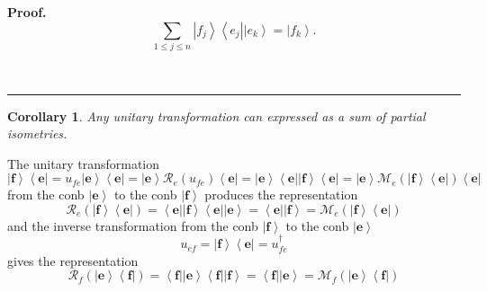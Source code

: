 \documentclass[aps,preprint]{revtex4}%
\newtheorem{corollary}[theorem]{Corollary}
\newenvironment{proof}[1][Proof]{\noindent\textbf{#1.} }{\ \rule{0.5em}{0.5em}}
\begin{document}
\begin{proof}%
\begin{equation}
\sum_{1\leq j\leq n}\left\vert f_{j}\right\rangle \left\langle e_{j}%
\right\vert \left\vert e_{k}\right\rangle =\left\vert f_{k}\right\rangle .
\end{equation}

\end{proof}

\begin{corollary}
\emph{Any unitary transformation can expressed as a sum of partial
isometries.}
\end{corollary}

The unitary transformation
\[
\left\vert \mathbf{f}\right\rangle \left\langle \mathbf{e}\right\vert
=u_{fe}\left\vert \mathbf{e}\right\rangle \left\langle \mathbf{e}\right\vert
=\left\vert \mathbf{e}\right\rangle \mathcal{R}_{e}\left(  u_{fe}\right)
\left\langle \mathbf{e}\right\vert =\left\vert \mathbf{e}\right\rangle
\left\langle \mathbf{e}\right\vert \left\vert \mathbf{f}\right\rangle
\left\langle \mathbf{e}\right\vert =\left\vert \mathbf{e}\right\rangle
\mathcal{M}_{e}\left(  \left\vert \mathbf{f}\right\rangle \left\langle
\mathbf{e}\right\vert \right)  \left\langle \mathbf{e}\right\vert
\]
from the conb $\left\vert \mathbf{e}\right\rangle $ to the conb $\left\vert
\mathbf{f}\right\rangle $ produces the representation
\begin{equation}
\mathcal{R}_{e}\left(  \left\vert \mathbf{f}\right\rangle \left\langle
\mathbf{e}\right\vert \right)  =\left\langle \mathbf{e}\right\vert \left\vert
\mathbf{f}\right\rangle \left\langle \mathbf{e}\right\vert \left\vert
\mathbf{e}\right\rangle =\left\langle \mathbf{e}\right\vert \left\vert
\mathbf{f}\right\rangle =\mathcal{M}_{e}\left(  \left\vert \mathbf{f}%
\right\rangle \left\langle \mathbf{e}\right\vert \right)
\end{equation}
and the inverse transformation from the conb $\left\vert \mathbf{f}%
\right\rangle $ to the conb $\left\vert \mathbf{e}\right\rangle $
\begin{equation}
u_{ef}=\left\vert \mathbf{f}\right\rangle \left\langle \mathbf{e}\right\vert
=u_{fe}^{\dagger}%
\end{equation}
gives the representation
\begin{equation}
\mathcal{R}_{f}\left(  \left\vert \mathbf{e}\right\rangle \left\langle
\mathbf{f}\right\vert \right)  =\left\langle \mathbf{f}\right\vert \left\vert
\mathbf{e}\right\rangle \left\langle \mathbf{f}\right\vert \left\vert
\mathbf{f}\right\rangle =\left\langle \mathbf{f}\right\vert \left\vert
\mathbf{e}\right\rangle =\mathcal{M}_{f}\left(  \left\vert \mathbf{e}%
\right\rangle \left\langle \mathbf{f}\right\vert \right)
\end{equation}
\end{document}
